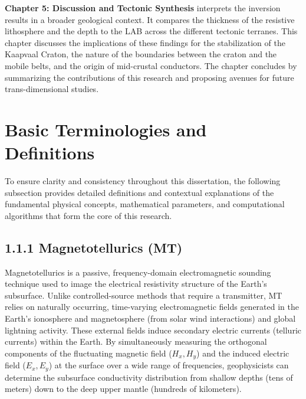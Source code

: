 \textbf{Chapter 5: Discussion and Tectonic Synthesis} interprets the inversion results in a broader geological context. It compares the thickness of the resistive lithosphere and the depth to the LAB across the different tectonic terranes. This chapter discusses the implications of these findings for the stabilization of the Kaapvaal Craton, the nature of the boundaries between the craton and the mobile belts, and the origin of mid-crustal conductors. The chapter concludes by summarizing the contributions of this research and proposing avenues for future trans-dimensional studies.

\newpage
\section{Basic Terminologies and Definitions}

To ensure clarity and consistency throughout this dissertation, the following subsection provides detailed definitions and contextual explanations of the fundamental physical concepts, mathematical parameters, and computational algorithms that form the core of this research.

\subsection{1.1.1 Magnetotellurics (MT)}
Magnetotellurics is a passive, frequency-domain electromagnetic sounding technique used to image the electrical resistivity structure of the Earth's subsurface. Unlike controlled-source methods that require a transmitter, MT relies on naturally occurring, time-varying electromagnetic fields generated in the Earth's ionosphere and magnetosphere (from solar wind interactions) and global lightning activity. These external fields induce secondary electric currents (telluric currents) within the Earth. By simultaneously measuring the orthogonal components of the fluctuating magnetic field ($H_x, H_y$) and the induced electric field ($E_x, E_y$) at the surface over a wide range of frequencies, geophysicists can determine the subsurface conductivity distribution from shallow depths (tens of meters) down to the deep upper mantle (hundreds of kilometers).

